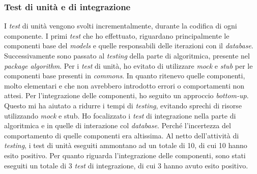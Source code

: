 \subsubsection{Test di unità e di integrazione}
I \emph{test} di unità vengono svolti incrementalmente, durante la codifica di ogni componente. I primi \emph{test} che ho effettuato, riguardano principalmente le componenti base del \emph{models} e quelle responsabili delle iterazioni con il \emph{database}. Successivamente sono passato al \emph{testing} della parte di algoritmica, presente nel \emph{package algorithm}. Per i \emph{test} di unità, ho evitato di utilizzare \emph{mock} e \emph{stub} per le componenti base presenti in \emph{commons}. In quanto ritenevo quelle componenti, molto elementari e che non avrebbero introdotto errori o comportamenti non attesi. Per l'integrazione delle componenti, ho seguito un approccio \emph{bottom-up}. Questo mi ha aiutato a ridurre i tempi di \emph{testing}, evitando sprechi di risorse utilizzando \emph{mock} e {stub}. Ho focalizzato i \emph{test} di integrazione nella parte di algoritmica e in quelle di interazione col \emph{database}. Perché l'incertezza del comportamento di quelle componenti era altissima. Al netto dell'attività di \emph{testing}, i test di unità eseguiti ammontano ad un totale di 10, di cui 10 hanno esito positivo. Per quanto riguarda l'integrazione delle componenti, sono stati eseguiti un totale di 3 \emph{test} di integrazione, di cui 3 hanno avuto esito positivo.

